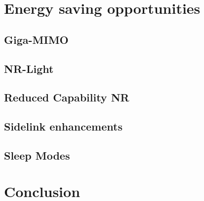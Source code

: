 \documentclass[11pt,a4paper]{article}
\begin{document}
\section{Energy saving opportunities}\label{sec:opportunities}


\subsection{Giga-MIMO}\label{subsec:gigamimo}
\subsection{NR-Light}\label{subsec:nrlight}
\subsection{Reduced Capability NR}\label{subsec:RedCap}
\subsection{Sidelink enhancements}\label{subsec:sidelink}
\subsection{Sleep Modes}\label{subsec:sleep}

\section{Conclusion}\label{sec:conclusion}


\clearpage

\appendix
\glsaddall
\printnoidxglossary[type=\acronymtype,nonumberlist]

\nocite{*}
\renewcommand*{\refname}{\section{References}}
{}
\end{document}
